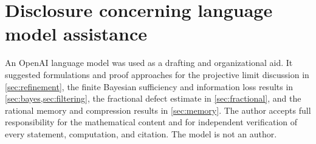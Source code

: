 \documentclass{aomart}
\theoremstyle{definition}
\theoremstyle{remark}
\begin{document}
\section*{Disclosure concerning language model assistance}

An OpenAI language model was used as a drafting and organizational aid. It suggested formulations and proof approaches for the projective limit discussion in \cref{sec:refinement}, the finite Bayesian sufficiency and information loss results in \cref{sec:bayes,sec:filtering}, the fractional defect estimate in \cref{sec:fractional}, and the rational memory and compression results in \cref{sec:memory}. The author accepts full responsibility for the mathematical content and for independent verification of every statement, computation, and citation. The model is not an author.



\end{document}
